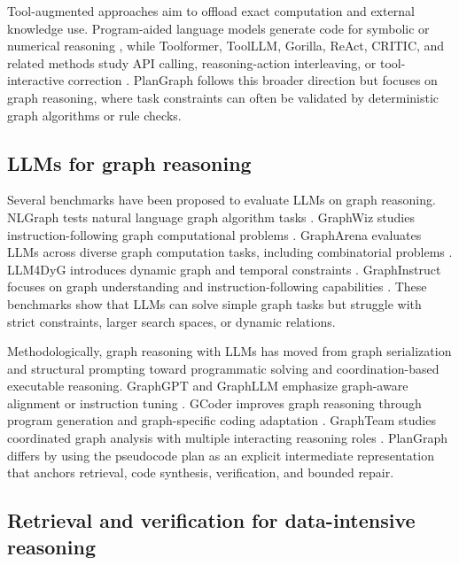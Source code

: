 \documentclass[pdflatex,sn-mathphys-num]{sn-jnl}
\theoremstyle{thmstyleone}
\theoremstyle{thmstyletwo}
\theoremstyle{thmstylethree}
\begin{document}
Tool-augmented approaches aim to offload exact computation and external knowledge use. Program-aided language models generate code for symbolic or numerical reasoning \cite{gao2023pal}, while Toolformer, ToolLLM, Gorilla, ReAct, CRITIC, and related methods study API calling, reasoning-action interleaving, or tool-interactive correction \cite{schick2023toolformer,qin2023toolllm,gorilla2024,yao2023react,critic2024}. PlanGraph follows this broader direction but focuses on graph reasoning, where task constraints can often be validated by deterministic graph algorithms or rule checks.

\subsection{LLMs for graph reasoning}

Several benchmarks have been proposed to evaluate LLMs on graph reasoning. NLGraph tests natural language graph algorithm tasks \cite{chen2024nlgraph}. GraphWiz studies instruction-following graph computational problems \cite{gong2024graphwiz}. GraphArena evaluates LLMs across diverse graph computation tasks, including combinatorial problems \cite{tang2025grapharena}. LLM4DyG introduces dynamic graph and temporal constraints \cite{llm4dyg2024}. GraphInstruct focuses on graph understanding and instruction-following capabilities \cite{graphinstruct2024}. These benchmarks show that LLMs can solve simple graph tasks but struggle with strict constraints, larger search spaces, or dynamic relations.

Methodologically, graph reasoning with LLMs has moved from graph serialization and structural prompting toward programmatic solving and coordination-based executable reasoning. GraphGPT and GraphLLM emphasize graph-aware alignment or instruction tuning \cite{tang2024graphgpt,chai2023graphllm}. GCoder improves graph reasoning through program generation and graph-specific coding adaptation \cite{zhang2025gcoder}. GraphTeam studies coordinated graph analysis with multiple interacting reasoning roles \cite{li2024graphteam}. PlanGraph differs by using the pseudocode plan as an explicit intermediate representation that anchors retrieval, code synthesis, verification, and bounded repair.

\subsection{Retrieval and verification for data-intensive reasoning}
\end{document}
